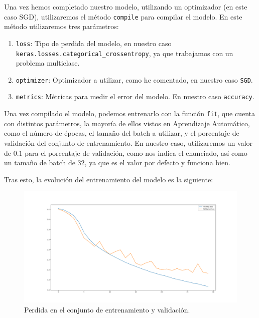 \documentclass[12pt, spanish]{article}
\begin{document}
Una vez hemos completado nuestro modelo, utilizando un optimizador (en este caso SGD\cite{sgd}), utilizaremos el método \texttt{compile} para compilar el modelo. En este método utilizaremos tres parámetros:

\begin{enumerate}
	\item \texttt{loss}: Tipo de perdida del modelo, en nuestro caso \texttt{keras.losses.categorical\_crossentropy}, ya que trabajamos con un problema multiclase.
	\item \texttt{optimizer}: Optimizador a utilizar, como he comentado, en nuestro caso \texttt{SGD}.
	\item \texttt{metrics}: Métricas para medir el error del modelo. En nuestro caso \texttt{accuracy}.

\end{enumerate}


Una vez compilado el modelo, podemos entrenarlo con la función \texttt{fit}, que cuenta con distintos parámetros, la mayoría de ellos vistos en Aprendizaje Automático, como el número de épocas, el tamaño del batch a utilizar, y el porcentaje de validación del conjunto de entrenamiento. En nuestro caso, utilizaremos un valor de $0.1$ para el porcentaje de validación, como nos indica el enunciado, así como un tamaño de batch de 32, ya que es el valor por defecto y funciona bien.

Tras esto, la evolución del entrenamiento del modelo es la siguiente:


\begin{figure}[H]
  \centering
      \includegraphics[width=\textwidth]{1-1-1.png}
 		\caption{Perdida en el conjunto de entrenamiento y validación.}
\end{figure}
\end{document}
